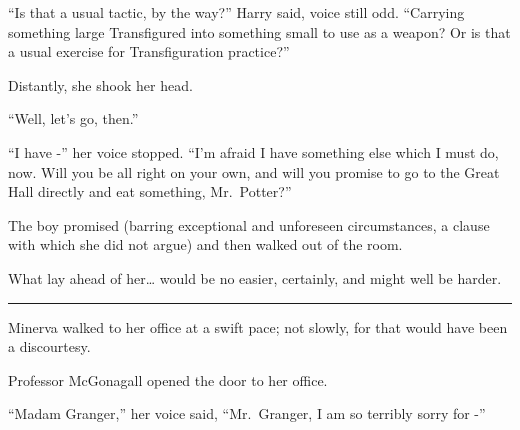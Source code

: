 ``Is that a usual tactic, by the way?'' Harry said, voice still odd.
``Carrying something large Transfigured into something small to use as a
weapon? Or is that a usual exercise for Transfiguration practice?''

Distantly, she shook her head.

``Well, let's go, then.''

``I have -'' her voice stopped. ``I'm afraid I have something else which
I must do, now. Will you be all right on your own, and will you promise
to go to the Great Hall directly and eat something, Mr.~Potter?''

The boy promised (barring exceptional and unforeseen circumstances, a
clause with which she did not argue) and then walked out of the room.

What lay ahead of her\ldots{} would be no easier, certainly, and might
well be harder.

\begin{center}\rule{3in}{0.4pt}\end{center}

Minerva walked to her office at a swift pace; not slowly, for that would
have been a discourtesy.

Professor McGonagall opened the door to her office.

``Madam Granger,'' her voice said, ``Mr.~Granger, I am so terribly sorry
for -''
